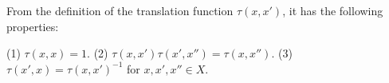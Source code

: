From the definition of the translation function $\tau(x, x')$, it has the following properties:

(1) $\tau(x, x) = 1$.
(2) $\tau(x, x')\tau(x', x'') = \tau(x, x'')$.
(3) $\tau(x', x) = \tau(x, x')^{-1}$ for $x, x', x'' \in X$.
